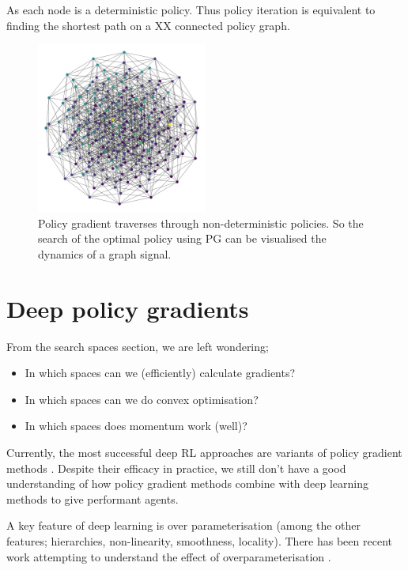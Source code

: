 As each node is a deterministic policy.
Thus policy iteration is equivalent to finding the shortest path on a XX connected policy graph.

\begin{figure}[!h]
\centering
\includegraphics[width=0.5\textwidth,height=0.3\textheight]{../../pictures/figures/interior-graph.png}
\caption{Policy gradient traverses through non-deterministic policies.
So the search of the optimal policy using PG can be visualised the dynamics of a graph signal.}
\end{figure}

\newpage
\section{Deep policy gradients}\label{ss-extras}

From the search spaces section, we are left wondering;

\begin{itemize}
\tightlist
\item In which spaces can we (efficiently) calculate gradients?
\item In which spaces can we do convex optimisation?
\item In which spaces does momentum work (well)?
\end{itemize}

Currently, the most successful deep RL approaches are variants of policy gradient methods \cite{Mnih2016,Schulmanb}.
Despite their efficacy in practice, we still don't have a good understanding of
how policy gradient methods combine with deep learning methods to give performant agents.

A key feature of deep learning is over parameterisation (among the other features;
hierarchies, non-linearity, smoothness, locality). There has been recent work
attempting to understand the effect of overparameterisation \cite{Arora2018}.

